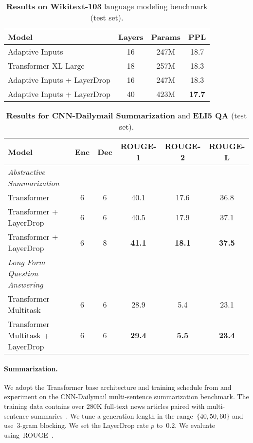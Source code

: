 \begin{table}[t]
\centering
\begin{tabular}{lccc}
\toprule
Model & Layers & Params & PPL \\
\midrule
Adaptive Inputs \citep{baevski2018adaptive} & 16 & 247M & 18.7 \\
Transformer XL Large \citep{dai2019transformer} & 18 & 257M & 18.3 \\
\midrule
Adaptive Inputs + LayerDrop & 16 & 247M & 18.3 \\
Adaptive Inputs + LayerDrop & 40 & 423M & \bf 17.7 \\
\bottomrule
\end{tabular}
\caption{
\textbf{Results on Wikitext-103} language modeling benchmark (test set).
}
\label{tab:wiki103_regularization}
\end{table}

\begin{table}[th]
\centering
\begin{tabular}{lccccc}
\toprule
Model & Enc & Dec & ROUGE-1 & ROUGE-2 & ROUGE-L \\
\midrule
\textit{Abstractive Summarization} & & & & & \\
Transformer \citep{edunov2019pre} & 6 & 6 & 40.1 & 17.6 & 36.8 \\
Transformer + LayerDrop & 6 & 6 & 40.5 & 17.9 & 37.1 \\
Transformer + LayerDrop & 6 & 8 & \bf 41.1 & \bf 18.1 & \bf 37.5 \\
\midrule
\textit{Long Form Question Answering} & & & & & \\
Transformer Multitask~\citep{fan2019eli5} & 6 & 6 & 28.9 & 5.4 & 23.1 \\
Transformer Multitask + LayerDrop & 6 & 6 & \bf 29.4 & \bf 5.5 & \bf 23.4 \\
\bottomrule
\end{tabular}
\caption{
\textbf{Results for CNN-Dailymail Summarization} and \textbf{ELI5 QA} (test set).}
\label{tab:tasks_regularization}
\end{table}


\paragraph{Summarization.}

We adopt the Transformer base architecture and training schedule from \cite{edunov2019pre} and experiment on the CNN-Dailymail multi-sentence summarization benchmark.
The training data contains over $280$K full-text news articles paired with multi-sentence summaries~\citep{hermann15, see2017acl}.
We tune a generation length in the range~$\{40, 50, 60\}$ and use~$3$-gram blocking. We set the LayerDrop rate $p$ to~$0.2$.
We evaluate using~ROUGE~\citep{lin04rouge}.

